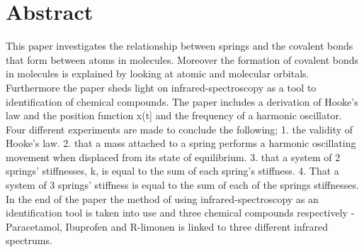 \section*{Abstract}
This paper investigates the relationship between springs and the covalent bonds that form between atoms in molecules. Moreover the formation of covalent bonds in molecules is explained by looking at atomic and molecular orbitals. Furthermore the paper sheds light on infrared-spectroscopy as a tool to identification of chemical compounds. The paper includes a derivation of Hooke's law and the position function x(t] and the frequency of a harmonic oscillator. Four different experiments are made to conclude the following; 1. the validity of Hooke's law. 2. that a  mass attached to a spring performs a harmonic oscillating movement when displaced from its state of equilibrium. 3. that a system of 2 springs' stiffnesses, k, is equal to the sum of each spring's stiffness. 4. That a system of 3 springs' stiffness is equal to the sum of each of the springs stiffnesses. 
In the end of the paper the method of using infrared-spectroscopy as an identification tool is taken into use and three chemical compounds respectively - Paracetamol, Ibuprofen and R-limonen is linked to three different infrared spectrums. 
